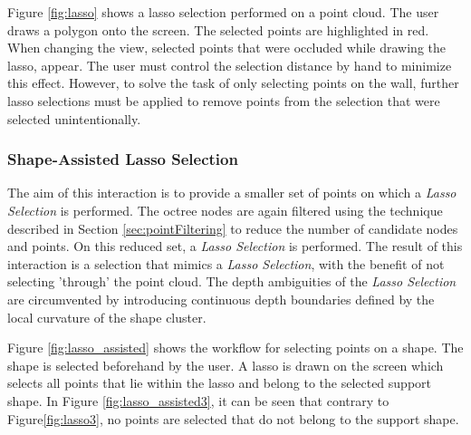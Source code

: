 Figure \ref{fig:lasso} shows a lasso selection performed on a point cloud. The user draws a polygon onto the screen. The selected points are highlighted in red. When changing the view, selected points that were occluded while drawing the lasso, appear. The user must control the selection distance by hand to minimize this effect. However, to solve the task of only selecting points on the wall, further lasso selections must be applied to remove points from the selection that were selected unintentionally. 


\subsubsection{Shape-Assisted Lasso Selection}

The aim of this interaction is to provide a smaller set of points on which a \textit{Lasso Selection} is performed.  The octree nodes are again filtered using the technique described in Section \ref{sec:pointFiltering} to reduce the number of candidate nodes and points. On this reduced set, a \textit{Lasso Selection} is performed. The result of this interaction is a selection that mimics a \textit{Lasso Selection}, with the benefit of not selecting 'through' the point cloud. The depth ambiguities of the \textit{Lasso Selection} are circumvented by introducing continuous depth boundaries defined by the local curvature of the shape cluster. 

Figure \ref{fig:lasso_assisted} shows the workflow for selecting points on a shape. The shape is selected beforehand by the user. A lasso is drawn on the screen which selects all points that lie within the lasso and belong to the selected support shape. In Figure \ref{fig:lasso_assisted3}, it can be seen that contrary to Figure\ref{fig:lasso3}, no points are selected that do not belong to the support shape.

